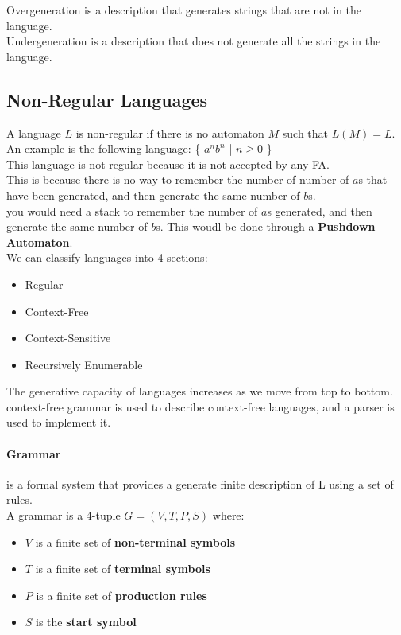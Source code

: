 Overgeneration is a description that generates strings that are not in the language.\\
Undergeneration is a description that does not generate all the strings in the language.\\

\subsection{Non-Regular Languages}
A language $L$ is non-regular if there is no automaton $M$ such that $L(M) = L$.\\
An example is the following language: \{ $a^n b^n$ | $n \geq 0$ \} \\
This language is not regular because it is not accepted by any FA. \\
This is because there is no way to remember the number of number of $a$s that have been generated, and then generate the same number of $b$s.\\
you would need a stack to remember the number of $a$s generated, and then generate the same number of $b$s. This woudl be done through a \textbf{Pushdown Automaton}.\\
We can classify languages into 4 sections:
\begin{itemize}
 \item Regular
 \item Context-Free
 \item Context-Sensitive
 \item Recursively Enumerable
\end{itemize}
The generative capacity of languages increases as we move from top to bottom.\\
context-free grammar is used to describe context-free languages, and a parser is used to implement it.\\

\paragraph{Grammar} is a formal system that provides a generate finite description of L using a set of rules.\\
A grammar is a 4-tuple $G = (V, T, P, S)$ where:
\begin{itemize}
 \item $V$ is a finite set of \textbf{non-terminal symbols}
 \item $T$ is a finite set of \textbf{terminal symbols}
 \item $P$ is a finite set of \textbf{production rules}
 \item $S$ is the \textbf{start symbol}
\end{itemize}

